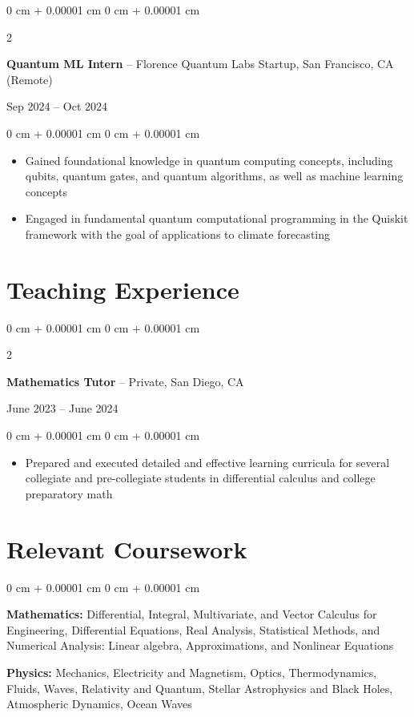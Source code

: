 \documentclass[10pt, letterpaper]{article}
\newenvironment{highlights}{
    \begin{itemize}[
        topsep=0.10 cm,
        parsep=0.10 cm,
        partopsep=0pt,
        itemsep=0pt,
        leftmargin=0 cm + 10pt
    ]
}{
    \end{itemize}
} %
\newenvironment{onecolentry}{
    \begin{adjustwidth}{
        0 cm + 0.00001 cm
    }{
        0 cm + 0.00001 cm
    }
}{
    \end{adjustwidth}
} %
\newenvironment{twocolentry}[2][]{
    \onecolentry
    \def\secondColumn{#2}
    \setcolumnwidth{\fill, 4.5 cm}
    \begin{paracol}{2}
}{
    \switchcolumn \raggedleft \secondColumn
    \end{paracol}
    \endonecolentry
} %
\begin{document}
          \begin{twocolentry}{
          Sep 2024 – Oct 2024
        }
        \vspace{0.1 cm}
            \textbf{Quantum ML Intern} – Florence Quantum Labs Startup, San Francisco, CA  (Remote)
        \end{twocolentry}
        \vspace{0.10 cm}
        \begin{onecolentry}
            \begin{highlights}
                \item Gained foundational knowledge in quantum computing concepts, including qubits, quantum gates, and quantum algorithms, as well as machine learning concepts
                \item Engaged in fundamental quantum computational programming in the Quiskit framework with the goal of applications to climate forecasting
            \end{highlights}
        \end{onecolentry}

        \section{Teaching Experience}
        
  
        \vspace{0.20 cm}
        \begin{twocolentry}{June 2023 --  June 2024} 
        
              \textbf{Mathematics Tutor} – Private, San Diego, CA  
        \end{twocolentry}
               \begin{onecolentry}
            \begin{highlights}
                \item  Prepared and executed detailed and effective learning curricula for several collegiate and pre-collegiate students in differential calculus and college preparatory math 
            \end{highlights}
        \end{onecolentry}
        
 \section{Relevant Coursework}
        \begin{onecolentry}
            \item \textbf{Mathematics:} Differential, Integral, Multivariate, and Vector Calculus for Engineering, Differential Equations, Real Analysis, Statistical Methods, and Numerical Analysis: Linear algebra, Approximations, and Nonlinear Equations
            \item \textbf{Physics:} Mechanics, Electricity and Magnetism, Optics, Thermodynamics, Fluids, Waves, Relativity and Quantum, Stellar Astrophysics and Black Holes, Atmospheric Dynamics, Ocean Waves
        \end{onecolentry}
\end{document}
